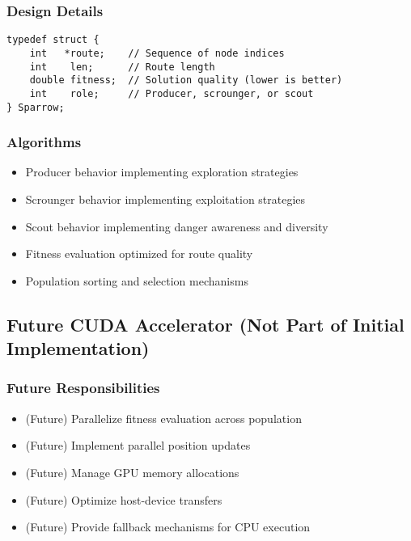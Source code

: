 \documentclass[conference]{IEEEtran}
\begin{document}
\subsubsection{Design Details}
\begin{lstlisting}[caption=Sparrow Representation]
typedef struct {
    int   *route;    // Sequence of node indices
    int    len;      // Route length
    double fitness;  // Solution quality (lower is better)
    int    role;     // Producer, scrounger, or scout
} Sparrow;
\end{lstlisting}

\subsubsection{Algorithms}
\begin{itemize}
    \item Producer behavior implementing exploration strategies
    \item Scrounger behavior implementing exploitation strategies
    \item Scout behavior implementing danger awareness and diversity
    \item Fitness evaluation optimized for route quality
    \item Population sorting and selection mechanisms
\end{itemize}

\subsection{Future CUDA Accelerator (Not Part of Initial Implementation)}

\subsubsection{Future Responsibilities}
\begin{itemize}
    \item (Future) Parallelize fitness evaluation across population
    \item (Future) Implement parallel position updates
    \item (Future) Manage GPU memory allocations
    \item (Future) Optimize host-device transfers
    \item (Future) Provide fallback mechanisms for CPU execution
\end{itemize}
\end{document}
